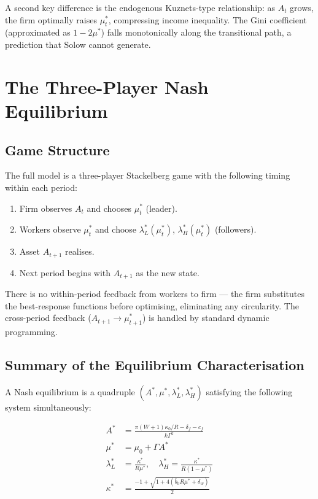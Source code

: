 \documentclass[12pt,a4paper]{article}
\begin{document}
A second key difference is the endogenous Kuznets-type relationship:
as $A_t$ grows, the firm optimally raises $\mu_t^*$, compressing
income inequality. The Gini coefficient (approximated as $1-2\mu^*$)
falls monotonically along the transitional path, a prediction that
Solow cannot generate.

\section{The Three-Player Nash Equilibrium}

\subsection{Game Structure}

The full model is a three-player Stackelberg game with the following
timing within each period:
\begin{enumerate}
  \item Firm observes $A_t$ and chooses $\mu_t^*$ (leader).
  \item Workers observe $\mu_t^*$ and choose $\lambda_L^*(\mu_t^*)$,
        $\lambda_H^*(\mu_t^*)$ (followers).
  \item Asset $A_{t+1}$ realises.
  \item Next period begins with $A_{t+1}$ as the new state.
\end{enumerate}
There is no within-period feedback from workers to firm — the firm
substitutes the best-response functions before optimising, eliminating
any circularity. The cross-period feedback ($A_{t+1} \to \mu_{t+1}^*$)
is handled by standard dynamic programming.

\subsection{Summary of the Equilibrium Characterisation}

A Nash equilibrium is a quadruple $(A^*, \mu^*, \lambda_L^*, \lambda_H^*)$
satisfying the following system simultaneously:

\begin{align}
  A^* &= \frac{\pi(W+1)\kappa_0/R - \delta_f - c_f}{k\Gamma^2}
  \tag{Firm stationarity} \\[4pt]
  \mu^* &= \mu_0 + \Gamma A^*
  \tag{Firm FOC} \\[4pt]
  \lambda_L^* &= \frac{\kappa^*}{R\mu^*},
  \quad
  \lambda_H^* = \frac{\kappa^*}{R(1-\mu^*)}
  \tag{Worker best responses} \\[4pt]
  \kappa^* &= \frac{-1+\sqrt{1+4(\bar{b}_0 R\mu^*+\delta_w)}}{2}
  \tag{Participation constraint}
\end{align}
\end{document}
